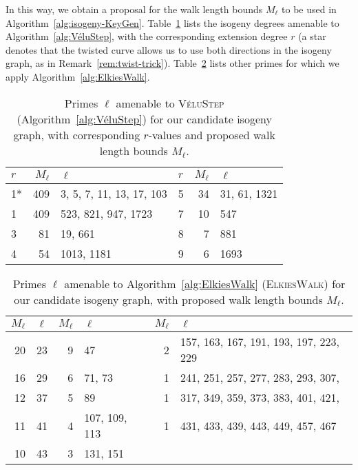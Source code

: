\documentclass{llncs}
\newcommand{\algstyle}[1]{\textsc{#1}}
\begin{document}
In this way, we obtain a proposal for the walk length bounds $M_\ell$
to be used in Algorithm~\ref{alg:isogeny-KeyGen}. Table~\ref{tab:VéluSteps}
lists the isogeny degrees amenable to Algorithm~\ref{alg:VéluStep}, with
the corresponding extension degree $r$ 
(a star denotes that the twisted curve
allows us to use both directions in the isogeny graph,
as in Remark~\ref{rem:twist-trick}).
Table~\ref{tab:ElkiesSteps}
lists other primes for which we apply Algorithm~\ref{alg:ElkiesWalk}.

\begin{table}
    \centering
    \begin{tabular}{l|@{\;}r@{\;}|@{\;}l@{\;}||@{\;}l|r@{\;}|@{\;}l}
        $r$ & $M_\ell$ & $\ell$
        &
        $r$ & $M_\ell$ & $\ell$
        \\
        \hline
        1* & 409 & 3, 5, 7, 11, 13, 17, 103
        &
        5 & 34 & 31, 61, 1321
        \\
        1 & 409 & 523, 821, 947, 1723
        &
        7 & 10 & 547
        \\
        3 & 81 & 19, 661
        &
        8 & 7 & 881
        \\
        4 & 54 & 1013, 1181
        &
        9 & 6 & 1693
        \\
        \hline
    \end{tabular}
    \smallskip
    \caption{Primes $\ell$ amenable to \algstyle{VéluStep}
    (Algorithm~\ref{alg:VéluStep}) for our candidate isogeny graph,
    with corresponding $r$-values and proposed walk length bounds $M_\ell$.}
    \label{tab:VéluSteps}
\end{table}

\begin{table}
    \centering
    \begin{tabular}{r@{\;}|@{\;}l@{\;}||@{\;}r@{\;}|@{\;}l@{\;}||@{\;}r@{\;}|@{\;}l@{\;}}
        $M_\ell$ & $\ell$
        &
        $M_\ell$ & $\ell$
        &
        $M_\ell$ & $\ell$
        \\
        \hline
        20 & 23
        &
        9  & 47
        &
        2  & 157, 163, 167, 191, 193, 197, 223, 229
        \\
        16 & 29
        &
        6  & 71, 73
        &
        1  & 241, 251, 257, 277, 283, 293, 307,
        \\
        12 & 37
        &
        5  & 89
        &
        1  & 317, 349, 359, 373, 383, 401, 421,
        \\
        11 & 41
        &
        4  & 107, 109, 113
        &
        1  & 431, 433, 439, 443, 449, 457, 467
        \\
        10 & 43
        &
        3  & 131, 151
        &
        \\
        \hline
    \end{tabular}
    \smallskip
    \caption{Primes $\ell$ amenable to 
        Algorithm~\ref{alg:ElkiesWalk} (\algstyle{ElkiesWalk})
        for our candidate isogeny graph, 
        with proposed walk length bounds $M_\ell$.}
    \label{tab:ElkiesSteps}
\end{table}
\end{document}
